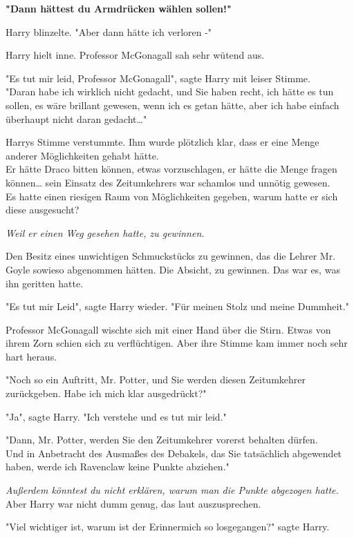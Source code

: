 {\textbf{"Dann hättest du Armdrücken wählen sollen!"}

Harry blinzelte. "Aber dann hätte ich verloren -"

Harry hielt inne. Professor McGonagall sah sehr wütend aus.

"Es tut mir leid, Professor McGonagall", sagte Harry mit leiser Stimme.\\ "Daran habe ich wirklich nicht gedacht, und Sie haben recht, ich hätte es tun sollen, es wäre brillant gewesen, wenn ich es getan hätte, aber ich habe einfach überhaupt nicht daran gedacht…"

Harrys Stimme verstummte. Ihm wurde plötzlich klar, dass er eine Menge anderer Möglichkeiten gehabt hätte.\\ Er hätte Draco bitten können, etwas vorzuschlagen, er hätte die Menge fragen können… sein Einsatz des Zeitumkehrers war schamlos und unnötig gewesen.\\ Es hatte einen riesigen Raum von Möglichkeiten gegeben, warum hatte er sich diese ausgesucht?

\emph{Weil er einen Weg gesehen hatte, zu gewinnen.}

Den Besitz eines unwichtigen Schmuckstücks zu gewinnen, das die Lehrer Mr. Goyle sowieso abgenommen hätten. Die Absicht, zu gewinnen. Das war es, was ihn geritten hatte.

"Es tut mir Leid", sagte Harry wieder. "Für meinen Stolz und meine Dummheit."

Professor McGonagall wischte sich mit einer Hand über die Stirn. Etwas von ihrem Zorn schien sich zu verflüchtigen. Aber ihre Stimme kam immer noch sehr hart heraus.

"Noch so ein Auftritt, Mr. Potter, und Sie werden diesen Zeitumkehrer zurückgeben. Habe ich mich klar ausgedrückt?"

"Ja", sagte Harry. "Ich verstehe und es tut mir leid."

"Dann, Mr. Potter, werden Sie den Zeitumkehrer vorerst behalten dürfen.\\ Und in Anbetracht des Ausmaßes des Debakels, das Sie tatsächlich abgewendet haben, werde ich Ravenclaw keine Punkte abziehen."

\emph{Außerdem könntest du nicht erklären, warum man die Punkte abgezogen hatte.}\\ Aber Harry war nicht dumm genug, das laut auszusprechen.

"Viel wichtiger ist, warum ist der Erinnermich so losgegangen?" sagte Harry.

}
